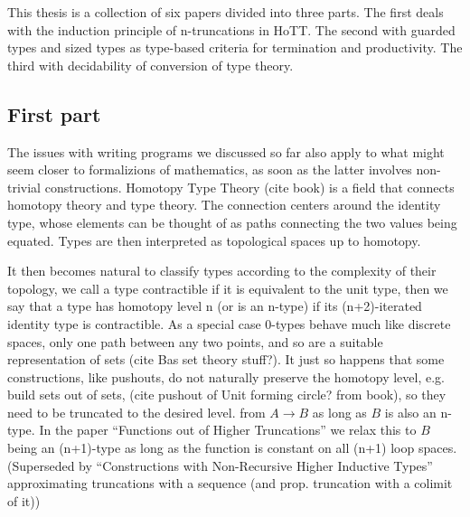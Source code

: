 \documentclass{article}
\begin{document}
This thesis is a collection of six papers divided into three parts.
The first deals with the induction principle of n-truncations in HoTT.
The second with guarded types and sized types as type-based criteria
for termination and productivity. The third with decidability of
conversion of type theory.

\subsection{First part}
The issues with writing programs we discussed so far also apply to
what might seem closer to formalizions of mathematics, as soon as the
latter involves non-trivial constructions.
Homotopy Type Theory (cite book) is a field that connects homotopy theory and type theory.
The connection centers around the identity type, whose elements can be
thought of as paths connecting the two values being equated. Types are
then interpreted as topological spaces up to homotopy.

It then becomes natural to classify types according to the complexity
of their topology, we call a type contractible if it is equivalent to
the unit type, then we say that a type has homotopy level n (or is an
n-type) if its (n+2)-iterated identity type is contractible. As a
special case 0-types behave much like discrete spaces, only one path
between any two points, and so are a suitable representation of sets (cite Bas set theory stuff?).
It just so happens that some constructions, like pushouts, do not
naturally preserve the homotopy level, e.g. build sets out of sets, (cite
pushout of Unit forming circle? from book), so they need to be
truncated to the desired level.
from $A \to B$ as long as $B$ is also an n-type.
In the paper ``Functions out of Higher Truncations'' we relax this to
$B$ being an (n+1)-type as long as the function is constant on all (n+1) loop spaces.
(Superseded by ``Constructions with Non-Recursive Higher Inductive
Types'' approximating truncations with a sequence (and
prop. truncation with a colimit of it))

\end{document}
